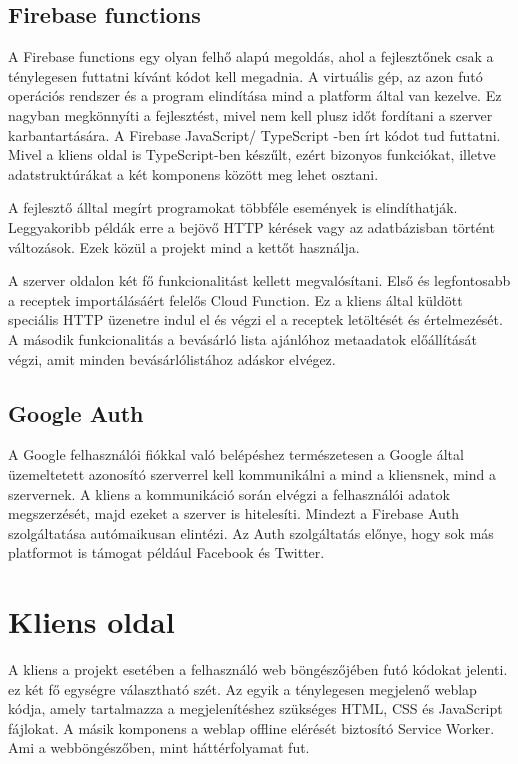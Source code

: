\documentclass[12pt]{report}
\theoremstyle{definition}
\begin{document}
\subsection{Firebase functions}
A Firebase functions egy olyan felhő alapú megoldás, ahol a fejlesztőnek csak a ténylegesen futtatni kívánt kódot kell megadnia. 
A virtuális gép, az azon futó operációs rendszer és a program elindítása mind a platform által van kezelve. Ez nagyban megkönnyíti a fejlesztést, mivel nem kell plusz időt fordítani a szerver karbantartására. A Firebase JavaScript/ \Gls{TypeScript} -ben írt kódot tud futtatni. Mivel a kliens oldal is \Gls{TypeScript}-ben készűlt, ezért bizonyos funkciókat, illetve adatstruktúrákat a két komponens között meg lehet osztani. 

A fejlesztő álltal megírt programokat többféle események is elindíthatják. Leggyakoribb példák erre a bejövő HTTP kérések vagy az adatbázisban történt változások. Ezek közül a projekt mind a kettőt használja. 

A szerver oldalon két fő funkcionalitást kellett megvalósítani. Első és legfontosabb a receptek importálásáért felelős Cloud Function. Ez a kliens által küldött speciális HTTP üzenetre indul el és végzi el a receptek letöltését és értelmezését. A második funkcionalitás a bevásárló lista ajánlóhoz metaadatok előállítását végzi, amit minden bevásárlólistához adáskor elvégez.

\subsection{Google Auth}
A Google felhasználói fiókkal való belépéshez természetesen a Google által üzemeltetett azonosító szerverrel kell kommunikálni a mind a kliensnek, mind a szervernek. A kliens a kommunikáció során elvégzi a felhasználói adatok megszerzését, majd ezeket a szerver is hitelesíti. Mindezt a Firebase Auth szolgáltatása autómaikusan elintézi. Az Auth szolgáltatás előnye, hogy sok más platformot is támogat például Facebook és Twitter. 

\section{Kliens oldal}
A kliens a projekt esetében a felhasználó web böngészőjében futó kódokat jelenti. ez két fő egységre választható szét. Az egyik a ténylegesen megjelenő weblap kódja, amely tartalmazza a megjelenítéshez szükséges HTML, CSS és JavaScript fájlokat. A másik komponens a weblap offline elérését biztosító Service Worker. Ami a webböngészőben, mint háttérfolyamat fut.
\end{document}
